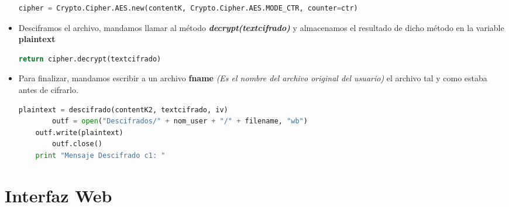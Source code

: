 \begin{itemize}
\begin{lstlisting}[language=Python,frame=single, keywordstyle=\color{blue},breaklines=true,showstringspaces=false]
cipher = Crypto.Cipher.AES.new(contentK, Crypto.Cipher.AES.MODE_CTR, counter=ctr)
\end{lstlisting}


		\item Desciframos el archivo, mandamos llamar al método \textbf{\textit{decrypt(textcifrado)}}  y almacenamos el resultado de dicho método en la variable \textbf{plaintext}
		
\begin{lstlisting}[language=Python,frame=single, keywordstyle=\color{blue},breaklines=true,showstringspaces=false]
    	return cipher.decrypt(textcifrado)
\end{lstlisting}

		\item Para finalizar, mandamos escribir a un archivo \textbf{fname} \textit{(Es el nombre del archivo original del usuario)} el archivo tal y como estaba antes de cifrarlo. 
			
\begin{lstlisting}[language=Python,frame=single, keywordstyle=\color{blue},breaklines=true,showstringspaces=false]
	plaintext = descifrado(contentK2, textcifrado, iv)
    	outf = open("Descifrados/" + nom_user + "/" + filename, "wb")
   	outf.write(plaintext)
    	outf.close()
   	print "Mensaje Descifrado c1: "
\end{lstlisting}

\end{itemize}

\section{Interfaz Web}

